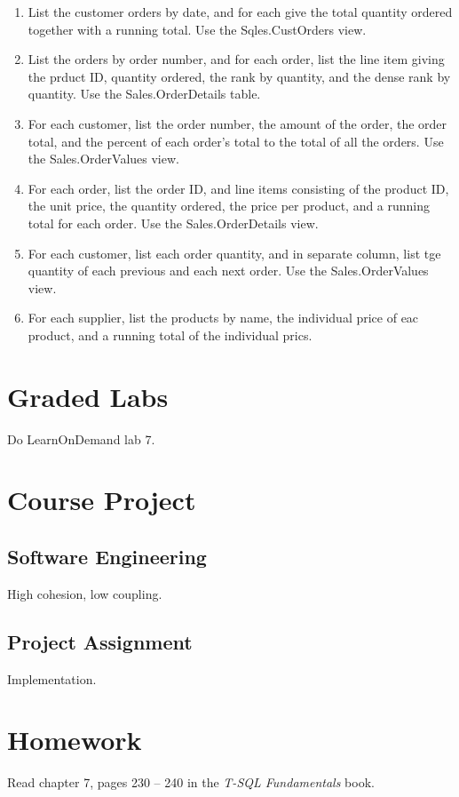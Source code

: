 \documentclass{article}
\begin{document}
    \begin{enumerate}
        \item List the customer orders by date, and for each give the total quantity ordered together with a running total. Use the Sqles.CustOrders view.
        \item List the orders by order number, and for each order, list the line item giving the prduct ID, quantity ordered, the rank by quantity, and the dense rank by quantity. Use the Sales.OrderDetails table.
        \item For each customer, list the order number, the amount of the order, the order total, and the percent of each order's total to the total of all the orders. Use the Sales.OrderValues view.
        \item For each order, list the order ID, and line items consisting of the product ID, the unit price, the quantity ordered, the price per product, and a running total for each order. Use the Sales.OrderDetails view.
        \item For each customer, list each order quantity, and in separate column, list tge quantity of each previous and each next order. Use the Sales.OrderValues view. 
        \item For each supplier, list the products by name, the individual price of eac product, and a running total of the individual prics.
    \end{enumerate}

    \section{Graded Labs}

    Do LearnOnDemand lab 7.

    \section{Course Project}


        \subsection{Software Engineering}

        High cohesion, low coupling.

        \subsection{Project Assignment}

        Implementation.

    \section{Homework}



        Read chapter 7, pages 230  -- 240  in the \textit{T-SQL Fundamentals} book.
        
\end{document}
